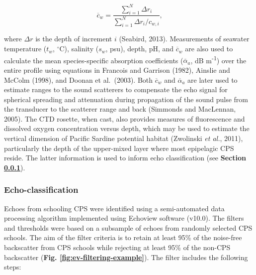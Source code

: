 \documentclass[]{article}
\begin{document}
\begin{equation}
 \overline{c}_w = \frac{\sum_{i=1}^{N} \Delta r_i}{\sum_{i=1}^{N} \Delta r_i/c_{w,i}}\text{,}
 \label{eq:time-avg-sound-speed}
\end{equation}

where \(\Delta r\) is the depth of increment \(i\) (Seabird, 2013). Measurements of seawater temperature (\(t_w\), \(^{\circ}\textrm{C}\)), salinity (\(s_w\), psu), depth, pH, and \(\overline{c}_w\) are also used to calculate the mean species-specific absorption coefficients (\(\overline{\alpha}_a\), dB m\textsuperscript{-1}) over the entire profile using equations in Francois and Garrison (1982), Ainslie and McColm (1998), and Doonan et al.~(2003). Both \(\overline{c}_w\) and \(\overline{\alpha}_a\) are later used to estimate ranges to the sound scatterers to compensate the echo signal for spherical spreading and attenuation during propagation of the sound pulse from the transducer to the scatterer range and back (Simmonds and MacLennan, 2005). The CTD rosette, when cast, also provides measures of fluorescence and dissolved oxygen concentration versus depth, which may be used to estimate the vertical dimension of Pacific Sardine potential habitat (Zwolinski \emph{et al.}, 2011), particularly the depth of the upper-mixed layer where most epipelagic CPS reside. The latter information is used to inform echo classification (see \textbf{Section \ref{methods-echo-classification}}).

\hypertarget{methods-echo-classification}{%
\subsubsection{Echo-classification}\label{methods-echo-classification}}

Echoes from schooling CPS were identified using a semi-automated data processing algorithm implemented using Echoview software (v10.0). The filters and thresholds were based on a subsample of echoes from randomly selected CPS schools. The aim of the filter criteria is to retain at least 95\% of the noise-free backscatter from CPS schools while rejecting at least 95\% of the non-CPS backscatter (\textbf{Fig. \ref{fig:ev-filtering-example}}). The filter includes the following steps:
\end{document}
